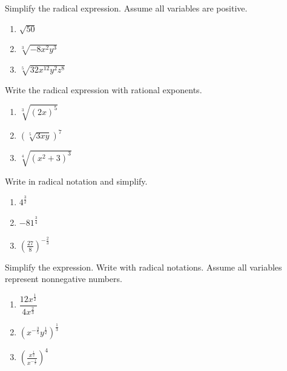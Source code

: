 \documentclass[en,12pt]{elegantbook}
\providecommand{\tightlist}{%
  \setlength{\itemsep}{0pt}\setlength{\parskip}{0pt}}
\let\BeginKnitrBlock\begin \let\EndKnitrBlock\end
\begin{document}
\BeginKnitrBlock{exercise}
\protect\hypertarget{exr:unnamed-chunk-101}{}{\label{exr:unnamed-chunk-101} }
Simplify the radical expression. Assume all variables are positive.

\begin{enumerate}
\def\labelenumi{\arabic{enumi}.}
\tightlist
\item
  \(\sqrt{50}\)
\item
  \(\sqrt[3]{-8x^2y^3}\)
\item
  \(\sqrt[5]{32x^{12}y^2z^8}\)
\end{enumerate}
\EndKnitrBlock{exercise}

\BeginKnitrBlock{exercise}
\protect\hypertarget{exr:unnamed-chunk-102}{}{\label{exr:unnamed-chunk-102} }
Write the radical expression with rational exponents.

\begin{enumerate}
\def\labelenumi{\arabic{enumi}.}
\tightlist
\item
  \(\sqrt[3]{(2x)^5}\)
\item
  \((\sqrt[5]{3xy})^7\)
\item
  \(\sqrt[4]{(x^2+3)^3}\)
\end{enumerate}
\EndKnitrBlock{exercise}

\BeginKnitrBlock{exercise}
\protect\hypertarget{exr:unnamed-chunk-103}{}{\label{exr:unnamed-chunk-103} }
Write in radical notation and simplify.

\begin{enumerate}
\def\labelenumi{\arabic{enumi}.}
\tightlist
\item
  \(4^{\frac32}\)
\item
  \(-81^{\frac 34}\)
\item
  \(\left(\frac{27}{8}\right)^{-\frac{2}{3}}\)
\end{enumerate}
\EndKnitrBlock{exercise}

\BeginKnitrBlock{exercise}
\protect\hypertarget{exr:unnamed-chunk-104}{}{\label{exr:unnamed-chunk-104} }
Simplify the expression. Write with radical notations. Assume all variables represent nonnegative numbers.

\begin{enumerate}
\def\labelenumi{\arabic{enumi}.}
\tightlist
\item
  \(\dfrac{12x^{\frac12}}{4x^{\frac23}}\)
\item
  \((x^{-\frac35}y^{\frac12})^{\frac13}\)
\item
  \(\left(\frac{x^{\frac12}}{x^{-\frac13}}\right)^4\)
\end{enumerate}
\EndKnitrBlock{exercise}
\end{document}

